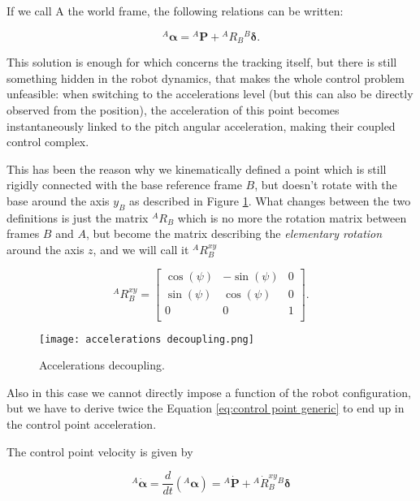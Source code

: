 If we call A the world frame, the following relations can be written:

\begin{equation}
{}^{A} \bm{\alpha} = {}^{A}\mathbf{P} + {}^{A} R_{B} {}^{B} \bm{\delta}.
\label{eq:control point generic}
\end{equation}

This solution is enough for which concerns the tracking itself, but there is still something hidden in the robot dynamics, that makes the whole control problem unfeasible: when switching to the accelerations level (but this can also be directly observed from the position), the acceleration of this point becomes instantaneously linked to the pitch angular acceleration, making their coupled control complex.

This has been the reason why we kinematically defined a point which is still rigidly connected with the base reference frame $B$, but doesn't rotate with the base around the axis $y_B$ as described in Figure \ref{fig:accelerations decoupling}.
What changes between the two definitions is just the matrix ${}^{A}R_{B}$ which is no more the rotation matrix between frames $B$ and $A$, but become the matrix describing the \textit{elementary rotation} around the axis $z$, and we will call it ${}^{A}R^{xy}_{B}$

\begin{equation}
{}^{A} R_B^{xy} = \begin{bmatrix}
\cos(\psi) & -\sin(\psi) & 0 \\
\sin(\psi) & \cos(\psi) & 0 \\
0 & 0 & 1 \\
\end{bmatrix}. 
\end{equation}

\begin{figure}
    \centering
    \texttt{[image: accelerations decoupling.png]}
    \caption{Accelerations decoupling.}
    \label{fig:accelerations decoupling}
\end{figure}

Also in this case we cannot directly impose a function of the robot configuration, but we have to derive twice the Equation \eqref{eq:control point generic} to end up in the control point acceleration.

The control point velocity is given by 

\begin{equation}
{}^{A} \dot{\bm{\alpha}} = \frac{d}{dt} ({}^{A} \bm{\alpha}) = {}^{A} \dot{\mathbf{P}} + {}^{A} \dot{R}_B^{xy} {}^{B} \bm{\delta}
\label{eq:control point velocity}
\end{equation}

